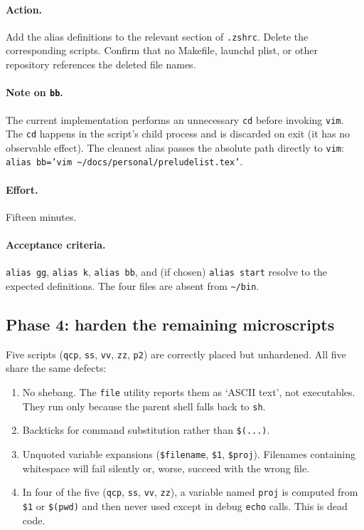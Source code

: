 \documentclass[11pt,letterpaper]{scrartcl}
\begin{document}
\paragraph{Action.} Add the alias definitions to the relevant
section of \texttt{.zshrc}. Delete the corresponding scripts.
Confirm that no Makefile, launchd plist, or other repository
references the deleted file names.

\paragraph{Note on \texttt{bb}.} The current implementation
performs an unnecessary \texttt{cd} before invoking \texttt{vim}.
The \texttt{cd} happens in the script's child process and is
discarded on exit (it has no observable effect). The cleanest
alias passes the absolute path directly to \texttt{vim}:
\texttt{alias bb='vim \textasciitilde/docs/personal/preludelist.tex'}.

\paragraph{Effort.} Fifteen minutes.

\paragraph{Acceptance criteria.} \texttt{alias gg}, \texttt{alias
k}, \texttt{alias bb}, and (if chosen) \texttt{alias start} resolve
to the expected definitions. The four files are absent from
\texttt{\textasciitilde/bin}.

\subsection{Phase 4: harden the remaining microscripts}

Five scripts (\texttt{qcp}, \texttt{ss}, \texttt{vv}, \texttt{zz},
\texttt{p2}) are correctly placed but unhardened. All five share
the same defects:

\begin{enumerate}
  \item No shebang. The \texttt{file} utility reports them as
        `ASCII text', not executables. They run only because the
        parent shell falls back to \texttt{sh}.
  \item Backticks for command substitution rather than
        \texttt{\$(...)}.
  \item Unquoted variable expansions (\texttt{\$filename},
        \texttt{\$1}, \texttt{\$proj}). Filenames containing
        whitespace will fail silently or, worse, succeed with the
        wrong file.
  \item In four of the five (\texttt{qcp}, \texttt{ss},
        \texttt{vv}, \texttt{zz}), a variable named \texttt{proj}
        is computed from \texttt{\$1} or \texttt{\$(pwd)} and then
        never used except in debug \texttt{echo} calls. This is
        dead code.
\end{enumerate}
\end{document}
